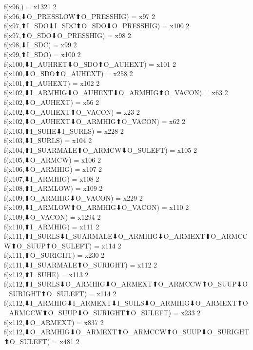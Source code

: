 f(x96,) = x1321 {2} \\
f(x96,⬇O_PRESSLOW⬆O_PRESSHIG) = x97 {2} \\
f(x97,⬆I_SDO⬇I_SDC⬆O_SDO⬇O_PRESSHIG) = x100 {2} \\
f(x97,⬆O_SDO⬇O_PRESSHIG) = x98 {2} \\
f(x98,⬇I_SDC) = x99 {2} \\
f(x99,⬆I_SDO) = x100 {2} \\
f(x100,⬇I_AUHRET⬇O_SDO⬆O_AUHEXT) = x101 {2} \\
f(x100,⬇O_SDO⬆O_AUHEXT) = x258 {2} \\
f(x101,⬆I_AUHEXT) = x102 {2} \\
f(x102,⬇I_ARMHIG⬇O_AUHEXT⬇O_ARMHIG⬆O_VACON) = x63 {2} \\
f(x102,⬇O_AUHEXT) = x56 {2} \\
f(x102,⬇O_AUHEXT⬆O_VACON) = x23 {2} \\
f(x102,⬇O_AUHEXT⬇O_ARMHIG⬆O_VACON) = x62 {2} \\
f(x103,⬆I_SUHE⬇I_SURLS) = x228 {2} \\
f(x103,⬇I_SURLS) = x104 {2} \\
f(x104,⬆I_SUARMALE⬆O_ARMCW⬇O_SULEFT) = x105 {2} \\
f(x105,⬇O_ARMCW) = x106 {2} \\
f(x106,⬇O_ARMHIG) = x107 {2} \\
f(x107,⬇I_ARMHIG) = x108 {2} \\
f(x108,⬆I_ARMLOW) = x109 {2} \\
f(x109,⬆O_ARMHIG⬇O_VACON) = x229 {2} \\
f(x109,⬇I_ARMLOW⬆O_ARMHIG⬇O_VACON) = x110 {2} \\
f(x109,⬇O_VACON) = x1294 {2} \\
f(x110,⬆I_ARMHIG) = x111 {2} \\
f(x111,⬆I_SURLS⬇I_SUARMALE⬇O_ARMHIG⬇O_ARMEXT⬆O_ARMCCW⬆O_SUUP⬆O_SULEFT) = x114 {2} \\
f(x111,⬆O_SURIGHT) = x230 {2} \\
f(x111,⬇I_SUARMALE⬆O_SURIGHT) = x112 {2} \\
f(x112,⬆I_SUHE) = x113 {2} \\
f(x112,⬆I_SURLS⬇O_ARMHIG⬇O_ARMEXT⬆O_ARMCCW⬆O_SUUP⬇O_SURIGHT⬆O_SULEFT) = x114 {2} \\
f(x112,⬇I_ARMHIG⬇I_ARMEXT⬇I_SUILS⬇O_ARMHIG⬇O_ARMEXT⬆O_ARMCCW⬆O_SUUP⬇O_SURIGHT⬆O_SULEFT) = x233 {2} \\
f(x112,⬇O_ARMEXT) = x837 {2} \\
f(x112,⬇O_ARMHIG⬇O_ARMEXT⬆O_ARMCCW⬆O_SUUP⬇O_SURIGHT⬆O_SULEFT) = x481 {2} \\
